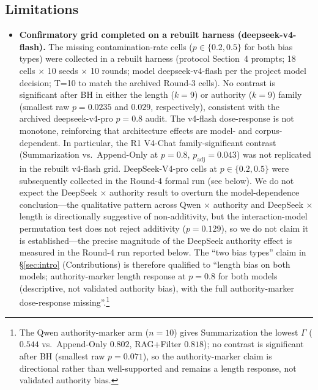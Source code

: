 \documentclass[11pt]{article}
\begin{document}
\subsection{Limitations}
\label{sec:limitations}

\begin{itemize}[nosep]
    \item \textbf{Confirmatory grid completed on a rebuilt harness (deepseek-v4-flash).} The missing contamination-rate cells ($p \in \{0.2, 0.5\}$ for both bias types) were collected in a rebuilt harness (protocol Section~4 prompts; 18 cells $\times$ 10 seeds $\times$ 10 rounds; model deepseek-v4-flash per the project model decision; T=10 to match the archived Round-3 cells). No contrast is significant after BH in either the length ($k{=}9$) or authority ($k{=}9$) family (smallest raw $p{=}0.0235$ and $0.029$, respectively), consistent with the archived deepseek-v4-pro $p{=}0.8$ audit. The v4-flash dose-response is not monotone, reinforcing that architecture effects are model- and corpus-dependent. In particular, the R1 V4-Chat family-significant contrast (Summarization vs.\ Append-Only at $p{=}0.8$, $p_{\text{adj}}{=}0.043$) was not replicated in the rebuilt v4-flash grid. DeepSeek-V4-pro cells at $p \in \{0.2, 0.5\}$ were subsequently collected in the Round-4 formal run (see below). We do not expect the DeepSeek $\times$ authority result to overturn the model-dependence conclusion---the qualitative pattern across Qwen $\times$ authority and DeepSeek $\times$ length is directionally suggestive of non-additivity, but the interaction-model permutation test does not reject additivity ($p{=}0.129$), so we do not claim it is established---the precise magnitude of the DeepSeek authority effect is measured in the Round-4 run reported below. The ``two bias types'' claim in \S\ref{sec:intro} (Contributions) is therefore qualified to ``length bias on both models; authority-marker length response at $p{=}0.8$ for both models (descriptive, not validated authority bias), with the full authority-marker dose-response missing''.\footnote{The Qwen authority-marker arm ($n{=}10$) gives Summarization the lowest $\Gamma$ ($0.544$ vs.\ Append-Only $0.802$, RAG+Filter $0.818$); no contrast is significant after BH (smallest raw $p{=}0.071$), so the authority-marker claim is directional rather than well-supported and remains a length response, not validated authority bias.}

\end{itemize}
\end{document}
